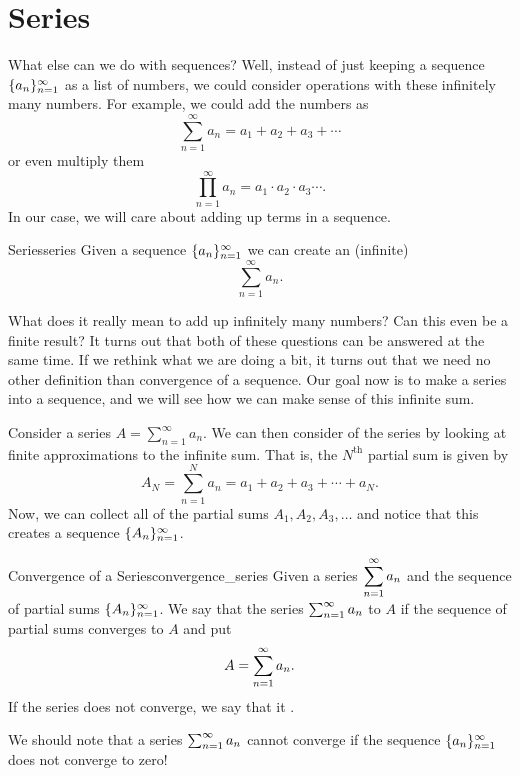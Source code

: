 \section{Series}

What else can we do with sequences? Well, instead of just keeping a sequence $\{a_n\}_{n=1}^\infty$ as a list of numbers, we could consider operations with these infinitely many numbers.  For example, we could add the numbers as
\[
\sum_{n=1}^\infty a_n = a_1 + a_2 + a_3 + \cdots
\]
or even multiply them
\[
\prod_{n=1}^\infty a_n = a_1\cdot a_2 \cdot a_3 \cdots.
\]
In our case, we will care about adding up terms in a sequence. 

\begin{df}{Series}{series}
Given a sequence $\{a_n\}_{n=1}^\infty$ we can create an (infinite) 
\[
\sum_{n=1}^\infty a_n.
\]
\end{df}

What does it really mean to add up infinitely many numbers? Can this even be a finite result? It turns out that both of these questions can be answered at the same time.  If we rethink what we are doing a bit, it turns out that we need no other definition than convergence of a sequence.  Our goal now is to make a series into a sequence, and we will see how we can make sense of this infinite sum.

Consider a series $A=\sum_{n=1}^\infty a_n$.  We can then consider  of the series by looking at finite approximations to the infinite sum.  That is, the $N^\textrm{th}$ partial sum is given by
\[
A_N = \sum_{n=1}^N a_n = a_1 + a_2 + a_3 + \cdots + a_N.
\]
Now, we can collect all of the partial sums $A_1,A_2,A_3,\dots$ and notice that this creates a sequence $\{A_n\}_{n=1}^\infty$.  

\begin{df}{Convergence of a Series}{convergence_series}
Given a series $\displaystyle{\sum_{n=1}^\infty a_n}$ and the sequence of partial sums $\{A_n\}_{n=1}^\infty$. We say that the series $\sum_{n=1}^\infty a_n$  to $A$ if the sequence of partial sums converges to $A$ and put
\[
A = \sum_{n=1}^\infty a_n.
\]
If the series does not converge, we say that it .
\end{df}

\begin{remark}
We should note that a series $\sum_{n=1}^\infty a_n$ cannot converge if the sequence $\{a_n\}_{n=1}^\infty$ does not converge to zero!
\end{remark}

